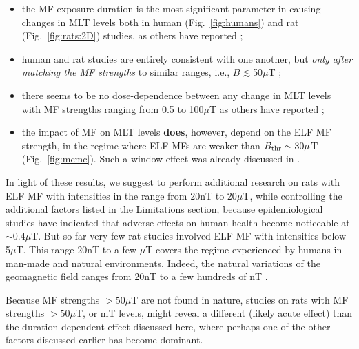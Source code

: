 \documentclass[letter,twoside]{article}
\begin{document}
\begin{itemize}
\item the MF exposure duration is the most significant parameter in causing changes in MLT levels both in human (Fig.~\ref{fig:humans}) and rat 
(Fig.~\ref{fig:rats:2D}) studies, as others have reported \citep[e.g.][]{Jahandideh2010,Kurokawa2003,Savitz2003,Selmaoui1995,Vanderstraeten2012a};
\item human and rat studies are entirely consistent with one another,  but {\it only after matching the MF strengths} to similar ranges, i.e., $B\lesssim$50$\mu$T ;
\item there seems to be no dose-dependence between any change in MLT levels with MF strengths ranging from 0.5 to 100$\mu$T as others have reported \citep[e.g.][]{Kato1993,Reiter1993,Pfluger1996,Halgamuge2013};
\item the impact of MF on MLT levels  {\bf does}, however, depend on the ELF MF strength, in the regime where  ELF MFs are weaker than   $B_{\rm thr}\sim30\mu$T  (Fig.~\ref{fig:mcmc}). Such a window effect   was already discussed in \citet{Loscher1998}.

\end{itemize}


In light of these results, we suggest to perform additional research on rats with ELF MF with intensities in the range from 20nT to 20$\mu$T, while controlling the additional factors listed in the Limitations section, because  epidemiological studies have indicated that adverse effects on human health become noticeable at $\sim$0.4$\mu$T. But so far very few rat studies involved ELF MF with intensities below 5$\mu$T.  
 This range 20nT to a few $\mu$T covers the regime experienced by humans in man-made and natural environments. Indeed, the natural variations of the geomagnetic field ranges from 20nT to a few hundreds of nT \citep{Hitchman1998}.
 
 Because MF strengths $>50\mu$T are  not found in nature,
 studies on rats with  MF strengths $>50\mu$T, or  mT levels,  might reveal a different (likely acute effect) than the duration-dependent effect discussed here,  where
  perhaps one of the other factors discussed earlier has become dominant.

\end{document}

